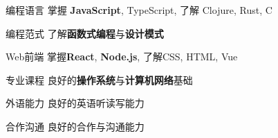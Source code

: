 

\begin{cvskills}

    \cvskill
    {编程语言} %
    {掌握 \textbf{JavaScript}, TypeScript, \hspace{1mm} 了解 Clojure, Rust, C} %

    \cvskill
    {编程范式} %
    {了解\textbf{函数式编程}与\textbf{设计模式}} %

    \cvskill
    {Web前端} %
    {掌握\textbf{React}, \textbf{Node.js}, 了解CSS, HTML, Vue} %

    \cvskill
    {专业课程} %
    {良好的\textbf{操作系统}与\textbf{计算机网络}基础} %

    \cvskill
    {外语能力} %
    {良好的英语听读写能力} %

    \cvskill
    {合作沟通} %
    {良好的合作与沟通能力} %

\end{cvskills}
